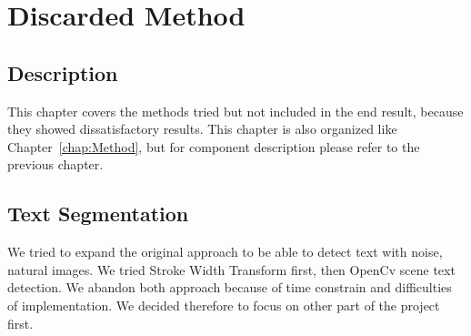 \documentclass[Report.tex]{subfiles}
\begin{document}
\chapter{Discarded Method}
\label{chap:Discarded Method}
\section{Description}
This chapter covers the methods tried but not included in the end result, because they showed dissatisfactory results. This chapter is also organized like Chapter~\ref{chap:Method}, but for component description please refer to the previous chapter.

\section{Text Segmentation}
We tried to expand the original approach to be able to detect text with noise, natural images. We tried Stroke Width Transform first, then OpenCv scene text detection. We abandon both approach because of time constrain and difficulties of implementation. We decided therefore to focus on other part of the project first.
\end{document}
